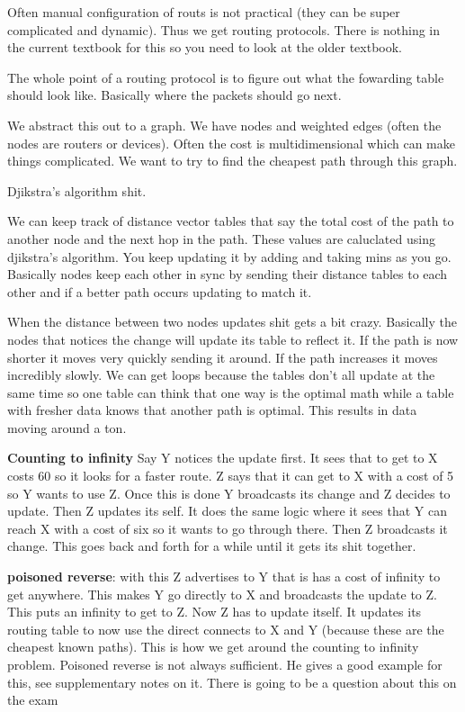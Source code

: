 \documentclass[12pt]{article}
\begin{document}

Often manual configuration of routs is not practical (they can be super complicated and dynamic). Thus we get routing protocols. There is nothing in the current textbook for this so you need to look at the older textbook.


The whole point of a routing protocol is to figure out what the fowarding table should look like. Basically where the packets should go next.



We abstract this out to a graph. We have nodes and weighted edges (often the nodes are routers or devices). Often the cost is multidimensional which can make things complicated. We want to try to find the cheapest path through this graph. 



Djikstra's algorithm shit. 


We can keep track of distance vector tables that say the total cost of the path to another node and the next hop in the path. These values are caluclated using djikstra's algorithm. You keep updating it by adding and taking mins as you go. Basically nodes keep each other in sync by sending their distance tables to each other and if a better path occurs updating to match it. 

When the distance between two nodes updates shit gets a bit crazy. Basically the nodes that notices the change will update its table to reflect it. If the path is now shorter it moves very quickly sending it around. If the path increases it moves incredibly slowly. We can get loops because the tables don't all update at the same time so one table can think that one way is the optimal math while a table with fresher data knows that another path is optimal. This results in data moving around a ton.

\textbf{Counting to infinity} Say Y notices the update first. It sees that to get to X costs 60 so it looks for a faster route. Z says that it can get to X with a cost of 5 so Y wants to use Z. Once this is done Y broadcasts its change and Z decides to update. Then Z updates its self. It does the same logic where it sees that Y can reach X with a cost of six so it wants to go through there. Then Z broadcasts it change. This goes back and forth for a while until it gets its shit together.

\textbf{poisoned reverse}: with this Z advertises to Y that is has a cost of infinity to get anywhere. This makes Y go directly to X and broadcasts the update to Z. This puts an infinity to get to Z. Now Z has to update itself. It updates its routing table to now use the direct connects to X and Y (because these are the cheapest known paths). This is how we get around the counting to infinity problem. Poisoned reverse is not always sufficient. He gives a good example for this, see supplementary notes on it. There is going to be a question about this on the exam
\end{document}
